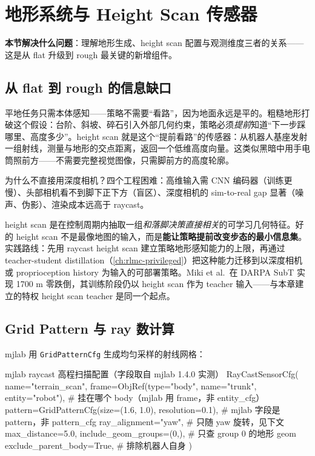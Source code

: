 \section{地形系统与 Height Scan 传感器}
\label{sec:rlmc-ql-terrain}

\textbf{本节解决什么问题}：理解地形生成、height scan 配置与观测维度三者的关系——这是从 flat 升级到 rough 最关键的新增组件。

\subsection{从 flat 到 rough 的信息缺口}
\label{sec:rlmc-ql-terrain-gap}

平地任务只需本体感知——策略不需要“看路”，因为地面永远是平的。粗糙地形打破这个假设：台阶、斜坡、碎石引入外部几何约束，策略必须\emph{提前}知道“下一步踩哪里、高度多少”。height scan 就是这个“提前看路”的传感器：从机器人基座发射一组射线，测量与地形的交点距离，返回一个低维高度向量。这类似黑暗中用手电筒照前方——不需要完整视觉图像，只需脚前方的高度轮廓。

为什么不直接用深度相机？四个工程困难：高维输入需 CNN 编码器（训练更慢）、头部相机看不到脚下正下方（盲区）、深度相机的 sim-to-real gap 显著（噪声、伪影）、渲染成本远高于 raycast。

\begin{insight}\label{ins:rlmc-ql-heightscan}
height scan 是在控制周期内抽取一组\emph{和落脚决策直接相关}的可学习几何特征。好的 height scan 不是最像地图的输入，而是\textbf{能让策略提前改变步态的最小信息集}。实践路线：先用 raycast height scan 建立策略地形感知能力的上限，再通过 teacher-student distillation（\cref{ch:rlmc-privileged}）把这种能力迁移到以深度相机或 proprioception history 为输入的可部署策略。Miki et al.\,\cite{miki2022perceptive} 在 DARPA SubT 实现 1700 m 零跌倒，其训练阶段仍以 height scan 作为 teacher 输入——与本章建立的特权 height scan teacher 是同一个起点。
\end{insight}

\subsection{Grid Pattern 与 ray 数计算}
\label{sec:rlmc-ql-terrain-grid}

mjlab 用 \verb|GridPatternCfg| 生成均匀采样的射线网格：

\begin{codebox}[Python]{mjlab raycast 高程扫描配置（字段取自 mjlab 1.4.0 实测）}
RayCastSensorCfg(
    name="terrain_scan",
    frame=ObjRef(type="body", name="trunk", entity="robot"),  # 挂在哪个 body（mjlab 用 frame，非 entity_cfg）
    pattern=GridPatternCfg(size=(1.6, 1.0), resolution=0.1),  # mjlab 字段是 pattern，非 pattern_cfg
    ray_alignment="yaw",            # 只随 yaw 旋转，见下文
    max_distance=5.0,
    include_geom_groups=(0,),        # 只查 group 0 的地形 geom
    exclude_parent_body=True,        # 排除机器人自身
)
\end{codebox}

